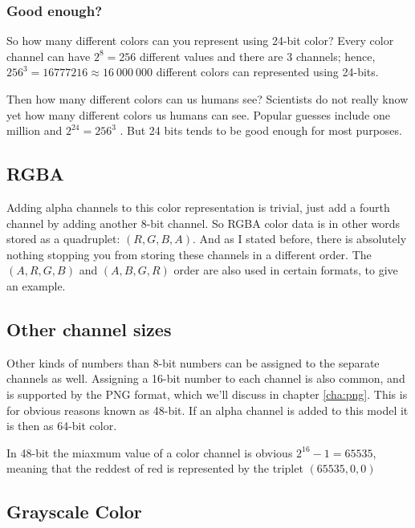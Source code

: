 \subsubsection{Good enough?}

So how many different colors can you represent using 24-bit color?
Every color channel can have $2^8 = 256$ different values and there
are $3$ channels; hence, $256^3 = 16777216 \approx 16\ 000\ 000$ different colors
can represented using 24-bits.

Then how many different colors can us humans see? Scientists do not
really know yet how many different colors us humans can see. Popular
guesses include one million \cite{roth:_tetrachromat} and $2^{24} =
256^3$ \cite{murray1996encyclopedia}. But 24 bits tends to be good
enough for most purposes.

\subsection{RGBA}

Adding alpha channels to this color representation is trivial, just
add a fourth channel by adding another 8-bit channel. So RGBA color
data is in other words stored as a quadruplet: $(R,G,B,A)$. And as I
stated before, there is absolutely nothing stopping you from storing these
channels in a different order. The $(A,R,G,B)$ and $(A,B,G,R)$ order are also
used in certain formats, to give an example.

\subsection{Other channel sizes}

Other kinds of numbers than 8-bit numbers can be assigned to the
separate channels as well. Assigning a 16-bit number to each channel
is also common, and is supported by the PNG
format\cite{boutel:_png_portab_networ_graph_specif_version12}, which
we'll discuss in chapter \ref{cha:png}. This is for obvious reasons
known as 48-bit. If an alpha channel is added to this model it is then
as 64-bit color.

In 48-bit the miaxmum value of a color channel is obvious $2^{16} - 1
= 65535$, meaning that the reddest of red is represented by the
triplet $(65535, 0, 0)$

\subsection{Grayscale Color}

